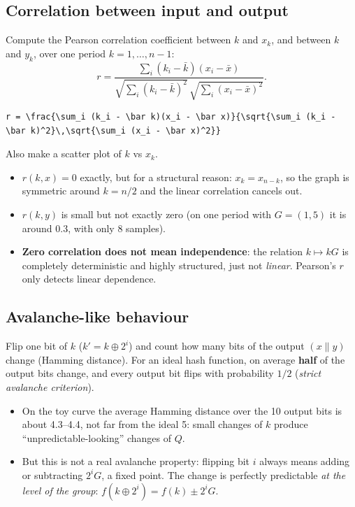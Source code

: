 \subsection{Correlation between input and output}

Compute the Pearson correlation coefficient between $k$ and $x_k$, and between $k$ and $y_k$, over one period $k = 1, \ldots, n-1$:
\[
  r = \frac{\sum_i (k_i - \bar k)(x_i - \bar x)}{\sqrt{\sum_i (k_i - \bar k)^2}\,\sqrt{\sum_i (x_i - \bar x)^2}} .
\]
\begin{lstlisting}[numbers=none]
r = \frac{\sum_i (k_i - \bar k)(x_i - \bar x)}{\sqrt{\sum_i (k_i - \bar k)^2}\,\sqrt{\sum_i (x_i - \bar x)^2}}\end{lstlisting}

Also make a scatter plot of $k$ vs $x_k$.
\begin{itemize}
  \item $r(k, x) = 0$ exactly, but for a structural reason: $x_k = x_{n-k}$, so the graph is symmetric around $k = n/2$ and the linear correlation cancels out.
  \item $r(k, y)$ is small but not exactly zero (on one period with $G = (1,5)$ it is around $0.3$, with only 8 samples).
  \item \textbf{Zero correlation does not mean independence}: the relation $k \mapsto kG$ is completely deterministic and highly structured, just not \textit{linear}. Pearson's $r$ only detects linear dependence.
\end{itemize}

\subsection{Avalanche-like behaviour}

Flip one bit of $k$ ($k' = k \oplus 2^i$) and count how many bits of the output $(x \| y)$ change (Hamming distance). For an ideal hash function, on average \textbf{half} of the output bits change, and every output bit flips with probability $1/2$ (\textit{strict avalanche criterion}).

\begin{itemize}
  \item On the toy curve the average Hamming distance over the 10 output bits is about 4.3--4.4, not far from the ideal 5: small changes of $k$ produce ``unpredictable-looking'' changes of $Q$.
  \item But this is not a real avalanche property: flipping bit $i$ always means adding or subtracting $2^i G$, a fixed point. The change is perfectly predictable \textit{at the level of the group}: $f(k \oplus 2^i) = f(k) \pm 2^i G$.
\end{itemize}

